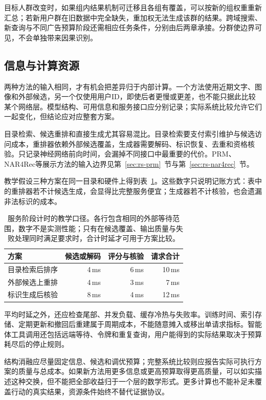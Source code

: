 目标人群改变时，如果组内结果机制可迁移且各组有覆盖，可以按新的组权重重新汇总；若新用户群在旧数据中完全缺失，重加权无法生成该群的结果。跨域搜索、新查询与不同广告预算阶段还需相应任务条件，分别由后两章承接。分群使边界可见，不会单独带来因果识别。

\subsection{信息与计算资源}
\label{sec:rs-evaluation-resources}

两种方法的输入相同，才有机会把差异归于内部计算。一个方法使用近期文字、图像和外部候选，另一个仅使用用户ID，即使后者更慢或更差，也不能只据此比较某个网络层。模型结构、可用信息和服务接口应分别记录；实际系统比较允许它们一起变化，但结论应对应整套方案。

目录检索、候选重排和直接生成尤其容易混比。目录检索要支付索引维护与候选访问成本，重排器依赖外部候选覆盖，生成器需要解码、标识恢复、去重和资格核验。只记录神经网络前向时间，会漏掉不同接口中最重要的代价。PRM、NAR4Rec等展示方法的输入边界见第~\ref{sec:rs-prm}~节与第~\ref{sec:rs-nar4rec}~节。

教学假设三种方案在同一目录和硬件上得到表~\ref{tab:rs-evaluation-resources}。这些数字只说明记账方式：表中的重排器若不计候选生成，会显得比完整服务便宜；生成器若不计核验，也会遗漏非法标识的成本。

\begin{table}[htbp]
  \centering
  \small
  \begin{tabularx}{\linewidth}{@{}Xrrr@{}}
    \toprule
    方案 & 候选或解码 & 评分与核验 & 请求合计\\
    \midrule
    目录检索后排序 & 4\,ms & 6\,ms & 10\,ms\\
    外部候选上重排 & 4\,ms & 3\,ms & 7\,ms\\
    标识生成后核验 & 8\,ms & 4\,ms & 12\,ms\\
    \bottomrule
  \end{tabularx}
  \caption{服务阶段计时的教学口径。各行包含相同的外部等待范围，数字不是实测性能；只有在候选覆盖、输出质量与失败处理同时满足要求时，合计时延才可用于方案比较。}
  \label{tab:rs-evaluation-resources}
\end{table}

平均时延之外，还应检查尾部、并发负载、缓存冷热与失败率。训练时间、索引存储、定期更新和撤回后重建属于周期成本，不能随意摊入或移出单请求指标。智能体工具调用还包括远端等待、令牌和重复查询，用户能得到的实际结果取决于预算耗尽后的停止规则。

结构消融应尽量固定信息、候选和调优预算；完整系统比较则应报告实际可执行方案的质量与总成本。如果新方法用更多信息或更高预算取得更高质量，可以如实描述这种交换，但不能把全部收益归于一个层的数学形式。更多计算也不能补足未覆盖行动的真实结果，资源条件始终不替代证据协议。

